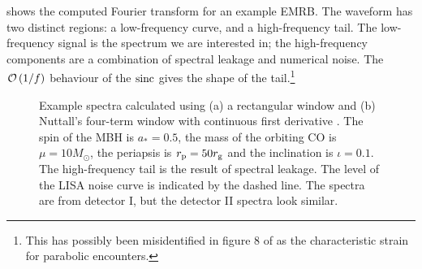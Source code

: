  shows the computed Fourier transform for an example EMRB. The waveform has two distinct regions: a low-frequency curve, and a high-frequency tail. The low-frequency signal is the spectrum we are interested in; the high-frequency components are a combination of spectral leakage and numerical noise. The $\mathcal{O}\left({1/{f}}\right)$ behaviour of the $\operatorname{sinc}$ gives the shape of the tail.\footnote{This has possibly been misidentified in figure 8 of \citet{Burko2007} as the characteristic strain for parabolic encounters.}
\begin{figure}%
  \centering
    \quad
    \caption{Example spectra calculated using (a) a rectangular window and (b) Nuttall's four-term window with continuous first derivative \citep{Nuttall1981}. The spin of the MBH is $a_\ast = 0.5$, the mass of the orbiting CO is $\mu = 10 M_\odot$, the periapsis is $r_\mathrm{p} = 50 r_\mathrm{g}$ and the inclination is $\iota = 0.1$. The high-frequency tail is the result of spectral leakage. The level of the LISA noise curve is indicated by the dashed line. The spectra are from detector I, but the detector II spectra look similar.}
  \label{fig:Windowing}
\end{figure}

